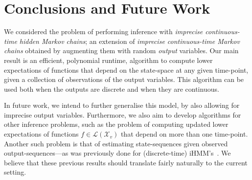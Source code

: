 \documentclass[twoside,11pt]{article}
\newcommand{\states}{\mathcal{X}}
\newcommand{\lexp}{\underline{\mathbb{E}}_{\rateset,\mathcal{M}}}
\newcommand{\gambles}{\mathcal{L}}
\newcommand{\rateset}{\mathcal{Q}}
\begin{document}
\section{Conclusions and Future Work}\label{sec:conclusions}

We considered the problem of performing inference with \emph{imprecise continuous-time hidden Markov chains}; an extension of \emph{imprecise continuous-time Markov chains} obtained by augmenting them with random \emph{output} variables. %
Our main result is an efficient, polynomial runtime, algorithm to compute lower expectations of functions that depend on the state-space at any given time-point, given a collection of observations of the output variables. This algorithm can be used both when the outputs are discrete and when they are continuous.

In future work, we intend to further generalise this model, by also allowing for imprecise output variables. Furthermore, we also aim to develop algorithms for other inference problems,
such as the problem of computing updated lower expectations of functions $f\in\gambles(\states_v)$ that depend on more than one time-point. Another such problem is that of estimating state-sequences given observed output-sequences---as was previously done for (discrete-time) iHMM's~\citep{DeBock:2014ts}. We believe that these previous results should 
translate fairly naturally to the current setting.

%
\end{document}
